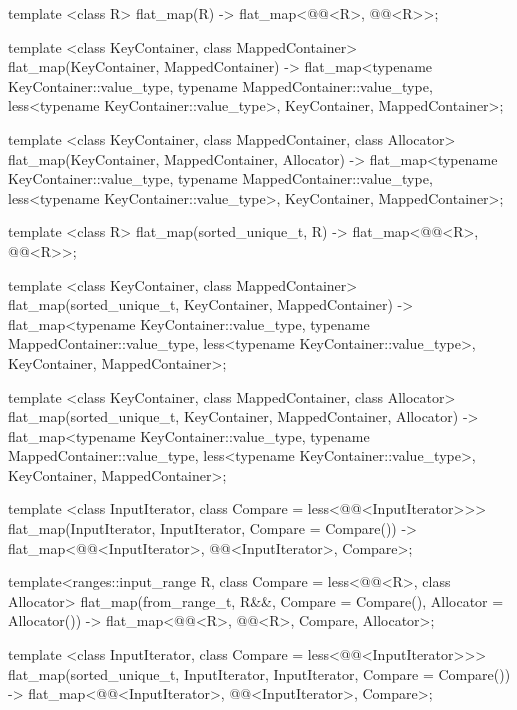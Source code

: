 \begin{addedblock}
\begin{codeblock}
{  template <class R>
    flat_map(R)
      -> flat_map<@@<R>, @@<R>>;

  template <class KeyContainer, class MappedContainer>
    flat_map(KeyContainer, MappedContainer)
      -> flat_map<typename KeyContainer::value_type,
                  typename MappedContainer::value_type,
                  less<typename KeyContainer::value_type>,
                  KeyContainer, MappedContainer>;

  template <class KeyContainer, class MappedContainer, class Allocator>
    flat_map(KeyContainer, MappedContainer, Allocator)
      -> flat_map<typename KeyContainer::value_type,
                  typename MappedContainer::value_type,
                  less<typename KeyContainer::value_type>,
                  KeyContainer, MappedContainer>;

  template <class R>
    flat_map(sorted_unique_t, R)
      -> flat_map<@@<R>, @@<R>>;

  template <class KeyContainer, class MappedContainer>
    flat_map(sorted_unique_t, KeyContainer, MappedContainer)
      -> flat_map<typename KeyContainer::value_type,
                  typename MappedContainer::value_type,
                  less<typename KeyContainer::value_type>,
                  KeyContainer, MappedContainer>;

  template <class KeyContainer, class MappedContainer, class Allocator>
    flat_map(sorted_unique_t, KeyContainer, MappedContainer, Allocator)
      -> flat_map<typename KeyContainer::value_type,
                  typename MappedContainer::value_type,
                  less<typename KeyContainer::value_type>,
                  KeyContainer, MappedContainer>;

  template <class InputIterator, class Compare = less<@@<InputIterator>>>
    flat_map(InputIterator, InputIterator, Compare = Compare())
      -> flat_map<@@<InputIterator>, @@<InputIterator>, Compare>;

  template<ranges::input_range R, class Compare = less<@@<R>,
           class Allocator>
    flat_map(from_range_t, R&&, Compare = Compare(), Allocator = Allocator())
      -> flat_map<@@<R>, @@<R>, Compare, Allocator>;

  template <class InputIterator, class Compare = less<@@<InputIterator>>>
    flat_map(sorted_unique_t, InputIterator, InputIterator, Compare = Compare())
      -> flat_map<@@<InputIterator>, @@<InputIterator>, Compare>;

}
\end{codeblock}
\end{addedblock}
